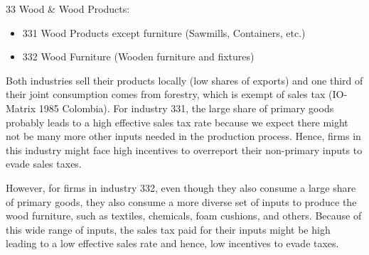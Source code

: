 \documentclass[
  12pt]{article}
\providecommand{\tightlist}{%
  \setlength{\itemsep}{0pt}\setlength{\parskip}{0pt}}\usepackage{longtable,booktabs,array}
\theoremstyle{definition}
\theoremstyle{remark}
\begin{document}
33 Wood \& Wood Products:

\begin{itemize}
\tightlist
\item
  331 Wood Products except furniture (Sawmills, Containers, etc.)
\item
  332 Wood Furniture (Wooden furniture and fixtures)
\end{itemize}

Both industries sell their products locally (low shares of exports) and
one third of their joint consumption comes from forestry, which is
exempt of sales tax (IO-Matrix 1985 Colombia). For industry 331, the
large share of primary goods probably leads to a high effective sales
tax rate because we expect there might not be many more other inputs
needed in the production process. Hence, firms in this industry might
face high incentives to overreport their non-primary inputs to evade
sales taxes.

However, for firms in industry 332, even though they also consume a
large share of primary goods, they also consume a more diverse set of
inputs to produce the wood furniture, such as textiles, chemicals, foam
cushions, and others. Because of this wide range of inputs, the sales
tax paid for their inputs might be high leading to a low effective sales
rate and hence, low incentives to evade taxes.

\begin{figure}


\caption{\label{fig-io-mat-1985}}

\end{figure}%
\end{document}
